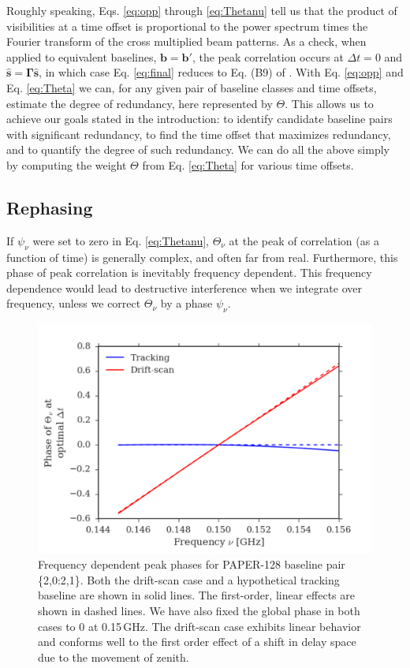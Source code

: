 \documentclass[twocolumn,apj,numberedappendix]{emulateapj}
\renewcommand\[{\begin{equation}}
\renewcommand\]{\end{equation}}
\begin{document}
Roughly speaking, Eqs. \eqref{eq:opp} through \eqref{eq:Thetanu} tell us that the product of visibilities at a time offset is proportional to the power spectrum times the Fourier
transform of the cross multiplied beam patterns. As a check, when applied to equivalent baselines,
$\boldsymbol{b}=\boldsymbol{b'}$, the peak correlation occurs at $\Delta t=0$ and $\hat{\boldsymbol{s}}=\boldsymbol{\Gamma}\hat{\boldsymbol{s}}$, in which case Eq. \eqref{eq:final} reduces to Eq. (B9) of \cite{paper32}. 
With Eq. \eqref{eq:opp} and Eq. \eqref{eq:Theta} we can, for any given pair of baseline classes and time offsets, estimate the degree of redundancy, here represented by $\Theta$. This allows us to achieve our goals stated in the introduction: to identify 
candidate baseline pairs with significant redundancy, to find the time offset that maximizes redundancy, and to quantify the degree of such redundancy. We can do all the above simply by computing the weight $\Theta$ from
Eq. \eqref{eq:Theta} for various time offsets.  



\subsection{Rephasing \label{sec:rephs}}
If $\psi_{\nu}$ were set to zero in  Eq. \eqref{eq:Thetanu}, $\Theta_{\nu}$ at the peak of correlation (as a function of time) is generally complex, and often far from real. Furthermore, this phase of peak correlation is inevitably frequency dependent. This frequency dependence would lead to destructive interference when we integrate over frequency, unless we correct $\Theta_{\nu}$ by a phase $\psi_\nu$. 

\begin{figure}[t]
\includegraphics[width=1\linewidth]{phi_nu}

\caption{Frequency dependent peak phases for PAPER-128 baseline pair \{2,0:2,1\}. Both the drift-scan case and a hypothetical tracking baseline are shown in solid lines. The first-order, linear effects are shown in dashed lines. We have also fixed the global phase in both cases to 0 at 0.15\,GHz. The drift-scan case exhibits linear behavior and conforms well to the first order effect of a shift in delay space due to the movement of zenith. }
\label{fig:phi_nu}
\end{figure}
\end{document}
